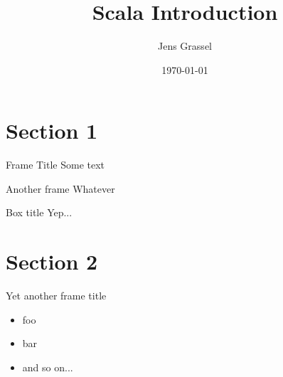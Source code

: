 \documentclass{beamer}
\title{Scala Introduction}
\date{\today}
\author{Jens Grassel}
\institute{Wegtam GmbH}
\begin{document}
  \maketitle

  \section{Section 1}
  \begin{frame}{Frame Title}
    Some text
  \end{frame}

  \begin{frame}{Another frame}
    Whatever
    \begin{alertblock}{Box title}
      Yep...
    \end{alertblock}
  \end{frame}

  \section{Section 2}
  \begin{frame}{Yet another frame title}
    \begin{itemize}
      \item foo
      \item bar
      \item and so on...
    \end{itemize}
  \end{frame}
\end{document}
